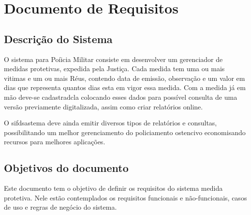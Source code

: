 \documentclass[
	12pt,				%
    oneside,			%
	a4paper,			%
	english,			%
	french,				%
	spanish,			%
	brazil,				%
	]{abntex2}
\begin{document}
\frenchspacing 


\imprimircapa

\imprimirfolhaderosto*

\tableofcontents


\textual




\chapter{Documento de Requisitos} %
	\section{Descrição do Sistema}
		O sistema para Poíicia Militar consiste em desenvolver um gerenciador de medidas protetivas, expedida pela Justiça. Cada medida tem uma ou mais vitimas e um ou mais Réus, contendo data de emissão, observação e um valor em dias que representa quantos dias esta em vigor essa medida. Com a medida já em mão deve-se cadastradcla colocando esses dados para possível consulta de uma versão previamente digitalizada, assim como criar relatórios online.
	
		O sifdsastema deve ainda emitir diversos tipos de relatórios e consultas, possibilitando um melhor gerenciamento do policiamento ostencivo economisando recursos para melhores aplicações.
		
	\section{Objetivos do documento}
	
		Este documento tem o objetivo de definir os requisitos do sistema medida protetiva. Nele estão contemplados os requisitos funcionais e não-funcionais, casos de uso e regras de negócio do sistema.
	
\end{document}
